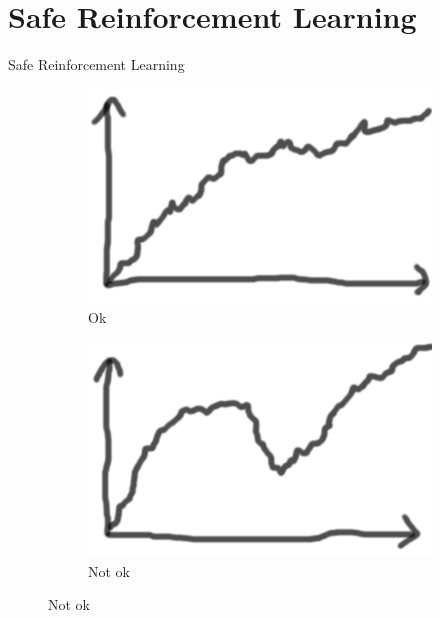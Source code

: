 \documentclass{beamer}
\begin{document}
\section{Safe Reinforcement Learning}

\begin{frame}{Safe Reinforcement Learning}
\begin{figure}
\begin{subfigure}[t]{0.495\textwidth}
\includegraphics[width=\textwidth]{pictures/safe_learning.png}
\caption{Ok}
\end{subfigure}
\hfill
\begin{subfigure}[t]{0.495\textwidth}
\includegraphics[width=\textwidth]{pictures/unsafe_learning.png}
\caption{Not ok}
\end{subfigure}
\end{figure}
\end{frame}
\end{document}

